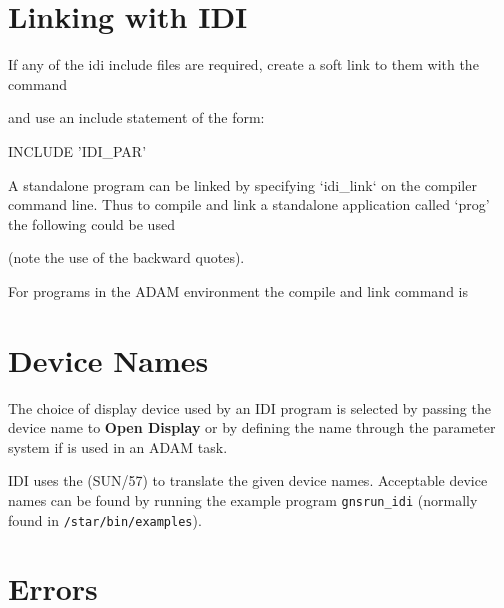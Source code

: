 \documentclass[11pt,nolof]{starlink}
\begin{document}
\newpage
\section{Linking with IDI}
If any of the idi include files are required, create a soft link to them
with the command
\begin{small}
\begin{terminalv}
\end{terminalv}
\end{small}
and use an include statement of the form:
\begin{small}
\begin{terminalv}
      INCLUDE 'IDI_PAR'
\end{terminalv}
\end{small}

A standalone program can be linked by specifying `idi\_link` on the
compiler command line. Thus to compile and link a standalone application
called `prog' the following could be used
\begin{small}
\begin{terminalv}
\end{terminalv}
\end{small}
(note the use of the backward quotes).

For programs in the ADAM environment the compile and link command is
\begin{small}
\end{small}

\section{Device Names}

The choice of display device used by an IDI program is selected by
passing the device name to \textbf{Open Display} or by defining the name
through the parameter system if
 is used in an ADAM task.

IDI uses the 
(SUN/57) to translate the given
device names. Acceptable device names can be found by running the example
program \texttt{gnsrun\_idi} (normally found in \texttt{/star/bin/examples}).


\section{Errors}
\end{document}
